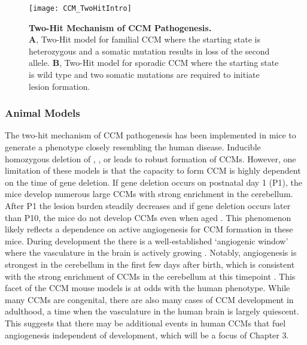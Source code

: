 \begin{figure}[tbp!]
\begin{center}
\texttt{[image: CCM\_TwoHitIntro]}
\end{center}
\caption[Two-Hit Mechanism of CCM Pathogenesis] {\textbf{Two-Hit Mechanism of CCM Pathogenesis.} \\ \textbf{A}, Two-Hit model for familial CCM where the starting state is heterozygous and a somatic mutation results in loss of the second allele. \textbf{B}, Two-Hit model for sporadic CCM where the starting state is wild type and two somatic mutations  are required to initiate lesion formation.}

\label{CCM_TwoHitIntro}
\end{figure}

\subsubsection{Animal Models}
The two-hit mechanism of CCM pathogenesis has been implemented in mice to generate a phenotype closely resembling the human disease. Inducible homozygous deletion of , , or  leads to robust formation of CCMs. However, one limitation of these models is that the capacity to form CCM is highly dependent on the time of gene deletion. If gene deletion occurs on postnatal day 1 (P1), the mice develop numerous large CCMs with strong enrichment in the cerebellum. After P1 the lesion burden steadily decreases and if gene deletion occurs later than P10, the mice do not develop CCMs even when aged \citep{boulday2011, detter2020}. This phenomenon likely reflects a dependence on active angiogenesis for CCM formation in these mice. During development the there is a well-established `angiogenic window' where the vasculature in the brain is actively growing \citep{boulday2009}. Notably, angiogenesis is strongest in the cerebellum in the first few days after birth, which is consistent with the strong enrichment of CCMs in the cerebellum at this timepoint \citep{boulday2009}. This facet of the CCM mouse models is at odds with the human phenotype. While many CCMs are congenital, there are also many cases of CCM development in adulthood, a time when the vasculature in the human brain is largely quiescent. This suggests that there may be additional events in human CCMs that fuel angiogenesis independent of development, which will be a focus of Chapter 3.